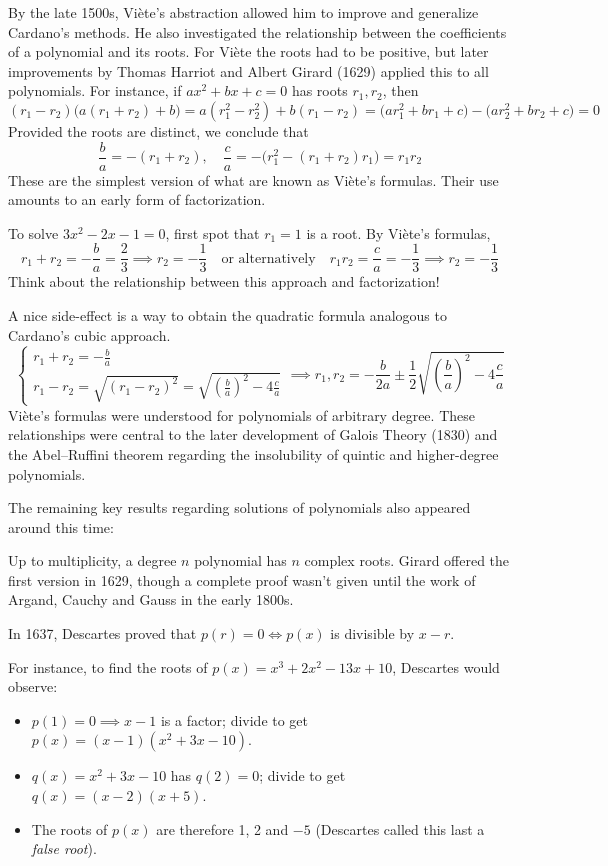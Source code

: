 
By the late 1500s, Viète's abstraction allowed him to improve and generalize Cardano's methods. He also investigated the relationship between the coefficients of a polynomial and its roots. For Viète the roots had to be positive, but later improvements by Thomas Harriot and Albert Girard (1629) applied this to all polynomials. For instance, if $ax^2+bx+c=0$ has roots $r_1,r_2$, then
\[
	(r_1-r_2)\bigl(a(r_1+r_2)+b\bigr) =a(r_1^2-r_2^2)+b(r_1-r_2)= \bigl(ar_1^2+br_1+c\bigr)-\bigl(ar_2^2+br_2+c\bigr) =0
\]
Provided the roots are distinct, we conclude that
\[
	\frac ba=-(r_1+r_2),\quad
	\frac ca=-\bigl(r_1^2-(r_1+r_2)r_1\bigr)=r_1r_2
\]
These are the simplest version of what are known as Viète's formulas. Their use amounts to an early form of factorization.



To solve $3x^2-2x-1=0$, first spot that $r_1=1$ is a root. By Viète's formulas,
\[
	r_1+r_2=-\frac ba=\frac 23\implies r_2=-\frac 13
	\quad\text{or alternatively}\quad
	r_1r_2=\frac ca=-\frac 13\implies r_2=-\frac 13
\]
Think about the relationship between this approach and factorization!\medbreak

A nice side-effect is a way to obtain the quadratic formula analogous to Cardano's cubic approach.
\[
	\begin{cases}
		r_1+r_2=-\frac ba\\
		r_1-r_2=\sqrt{(r_1-r_2)^2}=\sqrt{\left(\frac ba\right)^2-4\frac ca}
	\end{cases}
	\implies r_1,r_2=-\frac b{2a}\pm\frac 12\sqrt{\left(\frac ba\right)^2-4\frac ca}
\]
Viète's formulas were understood for polynomials of arbitrary degree. These relationships were central to the later development of Galois Theory (1830) and the Abel--Ruffini theorem regarding the insolubility of quintic and higher-degree polynomials.\medskip

The remaining key results regarding solutions of polynomials also appeared around this time:
\begin{description}\label{pg:factorthm}
	\item[Fundamental Theorem of Algebra] Up to multiplicity, a degree $n$ polynomial has $n$ complex roots. Girard offered the first version in 1629, though a complete proof wasn't given until the work of Argand, Cauchy and Gauss in the early 1800s.
	\item[Factor Theorem] In 1637, Descartes proved that $p(r)=0\iff p(x)$ is divisible by $x-r$.\par
For instance, to find the roots of $p(x)=x^3+2x^2-13x+10$, Descartes would observe:
\begin{itemize}
  \item $p(1)=0\implies x-1$ is a factor; divide to get $p(x)=(x-1)(x^2+3x-10)$.
  \item $q(x)=x^2+3x-10$ has $q(2)=0$; divide to get $q(x)=(x-2)(x+5)$.
  \item The roots of $p(x)$ are therefore 1, 2 and $-5$ (Descartes called this last a \emph{false root}).
\end{itemize}
\end{description}


